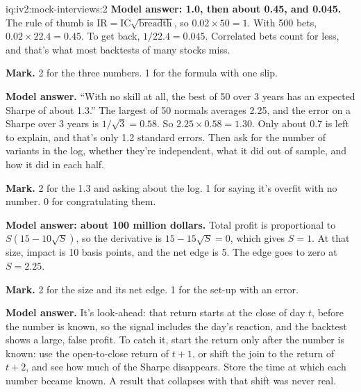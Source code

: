 \begin{solution}{iq:iv2:mock-interviews:2}
\ivstop
\textbf{Model answer: 1.0, then about 0.45, and 0.045.} The rule of thumb is $\text{IR} = \text{IC}\sqrt{\text{breadth}}$, so $0.02 \times 50 = 1$. With 500 bets, $0.02 \times 22.4 = 0.45$. To get back, $1/22.4 = 0.045$. Correlated bets count for less, and that's what most backtests of many stocks miss.

\textbf{Mark.} 2 for the three numbers. 1 for the formula with one slip.

\ivstop
\textbf{Model answer.} ``With no skill at all, the best of 50 over 3 years has an expected Sharpe of about 1.3.'' The largest of 50 normals averages 2.25, and the error on a Sharpe over 3 years is $1/\sqrt{3} = 0.58$. So $2.25 \times 0.58 = 1.30$. Only about 0.7 is left to explain, and that's only 1.2 standard errors. Then ask for the number of variants in the log, whether they're independent, what it did out of sample, and how it did in each half.

\textbf{Mark.} 2 for the 1.3 and asking about the log. 1 for saying it's overfit with no number. 0 for congratulating them.

\ivstop
\textbf{Model answer: about 100 million dollars.} Total profit is proportional to $S(15 - 10\sqrt{S})$, so the derivative is $15 - 15\sqrt{S} = 0$, which gives $S = 1$. At that size, impact is 10 basis points, and the net edge is 5. The edge goes to zero at $S = 2.25$.

\textbf{Mark.} 2 for the size and its net edge. 1 for the set-up with an error.

\ivstop
\textbf{Model answer.} It's look-ahead: that return starts at the close of day $t$, before the number is known, so the signal includes the day's reaction, and the backtest shows a large, false profit. To catch it, start the return only after the number is known: use the open-to-close return of $t + 1$, or shift the join to the return of $t + 2$, and see how much of the Sharpe disappears. Store the time at which each number became known. A result that collapses with that shift was never real.


\end{solution}
